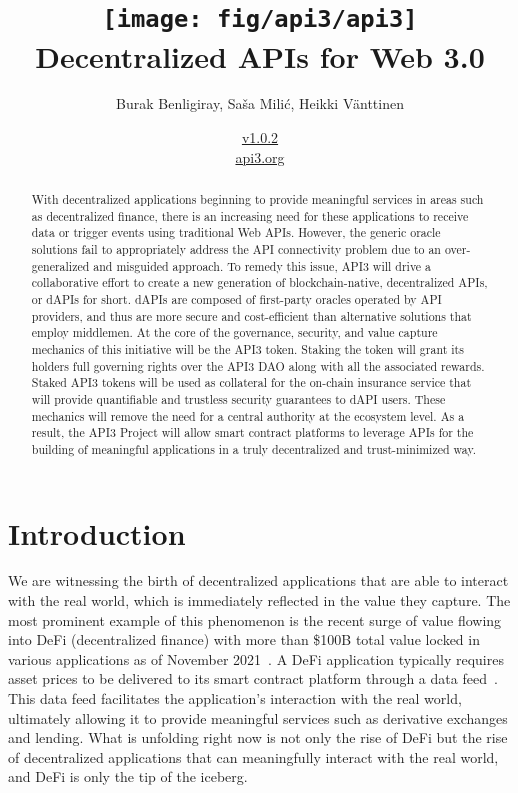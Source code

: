 \documentclass[11pt]{article}
\title{\texttt{[image: fig/api3/api3]} \\ Decentralized APIs for Web 3.0}
\author{Burak Benligiray, Sa\v{s}a Mili\'{c}, Heikki Vänttinen}
\date{\hyperref[sec:versions]{v1.0.2} \\ \medskip \href{https://api3.org}{api3.org}}
\begin{document}

\maketitle

\begin{abstract}
\noindent 
With decentralized applications beginning to provide meaningful services in areas such as decentralized finance, there is an increasing need for these applications to receive data or trigger events using traditional Web APIs.
However, the generic oracle solutions fail to appropriately address the API connectivity problem due to an over-generalized and misguided approach.
To remedy this issue, API3 will drive a collaborative effort to create a new generation of blockchain-native, decentralized APIs, or dAPIs for short.
dAPIs are composed of first-party oracles operated by API providers, and thus are more secure and cost-efficient than alternative solutions that employ middlemen.
At the core of the governance, security, and value capture mechanics of this initiative will be the API3 token.
Staking the token will grant its holders full governing rights over the API3 DAO along with all the associated rewards.
Staked API3 tokens will be used as collateral for the on-chain insurance service that will provide quantifiable and trustless security guarantees to dAPI users.
These mechanics will remove the need for a central authority at the ecosystem level.
As a result, the API3 Project will allow smart contract platforms to leverage APIs for the building of meaningful applications in a truly decentralized and trust-minimized way.
\end{abstract}

\newpage
{}
\setcounter{page}{2}
\renewcommand{\contentsname}{} %
\tableofcontents


\newpage
{}
\setcounter{page}{1}

\section{Introduction}
\label{sec:introduction}

We are witnessing the birth of decentralized applications that are able to interact with the real world, which is immediately reflected in the value they capture.
The most prominent example of this phenomenon is the recent surge of value flowing into DeFi (decentralized finance) with more than \$100B total value locked in various applications as of November 2021~\cite{defipulse}.
A DeFi application typically requires asset prices to be delivered to its smart contract platform through a data feed~\cite{liu:2020}.
This data feed facilitates the application’s interaction with the real world, ultimately allowing it to provide meaningful services such as derivative exchanges and lending.
What is unfolding right now is not only the rise of DeFi but the rise of decentralized applications that can meaningfully interact with the real world, and DeFi is only the tip of the iceberg.
\end{document}
